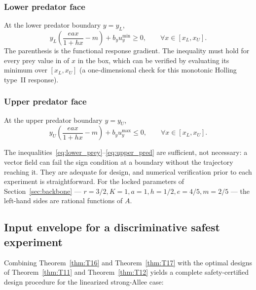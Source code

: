 \subsubsection*{Lower predator face}

At the lower predator boundary \(y = y_L\),
\begin{equation}
\boxed{
y_L \left(\frac{e a x}{1 + h x} - m\right) + b_y u_y^{\min} \ge 0,\qquad
\forall x \in [x_L, x_U] }.
\label{eq:lower_pred}
\end{equation}
The parenthesis is the functional response gradient. The inequality must hold for every prey value in of \(x\) in the box, which can be verified by evaluating its minimum over \([x_L, x_U]\) (a one-dimensional check for this monotonic Holling type~II response).

\subsubsection*{Upper predator face}

At the upper predator boundary \(y = y_U\),
\begin{equation}
\boxed{
y_U \left(\frac{e a x}{1 + h x} - m\right) + b_y u_y^{\max} \le 0,\qquad
\forall x \in [x_L, x_U] }.
\label{eq:upper_pred}
\end{equation}

The inequalities~\eqref{eq:lower_prey}--\eqref{eq:upper_pred} are sufficient, not necessary: a vector field can fail the sign condition at a boundary without the trajectory reaching it. They are adequate for design, and numerical verification prior to each experiment is straightforward. For the locked parameters of Section~\ref{sec:backbone} --- \(r = 3/2, K = 1, a = 1, h = 1/2, e = 4/5, m = 2/5\) --- the left-hand sides are rational functions of \(A\).

\subsection{Input envelope for a discriminative safest experiment}

Combining Theorem~\ref{thm:T16} and Theorem~\ref{thm:T17} with the optimal designs of Theorem~\ref{thm:T11} and Theorem~\ref{thm:T12} yields a complete safety-certified design procedure for the linearized strong-Allee case:


